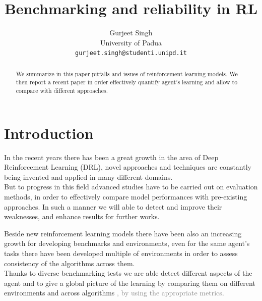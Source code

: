 \documentclass{article}
\title{Benchmarking and reliability in RL}
\author{Gurjeet Singh\\
  University of Padua\\
  \texttt{gurjeet.singh@studenti.unipd.it}
}
\begin{document}
\maketitle

\begin{abstract}
	We summarize in this paper pitfalls and issues of reinforcement learning models. We then report a recent paper in order effectively quantify agent's learning and allow to compare with different approaches.
	
\end{abstract}

\section{Introduction}
In the recent years there has been a great growth in the area of Deep Reinforcement Learning (DRL), novel approaches and techniques are constantly being invented and applied in many different domains.\\
But to progress in this field advanced studies have to be carried out on evaluation methods, in order to effectively compare model performances with pre-existing approaches. In such a manner we will able to detect and improve their weaknesses, and enhance results for further works.

Beside new reinforcement learning models there have been also an increasing growth for developing benchmarks and environments, even for the same agent's tasks there have been developed multiple of environments in order to assess consistency of the algorithms across them.\\
Thanks to diverse benchmarking tests we are able detect different aspects of the agent and to give a global picture of the learning by comparing them on different environments and across algorithms \textcolor{gray}{, by using the appropriate metrics}.
\end{document}
